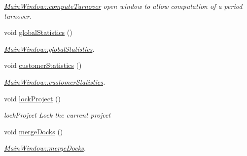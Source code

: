 \begin{DoxyCompactItemize}
\begin{DoxyCompactList}\small\item\em \hyperlink{classGui_1_1MainWindow_aa4cfc2b980835fe1ccd5b869a237c05f}{Main\-Window\-::compute\-Turnover} open window to allow computation of a period turnover. \end{DoxyCompactList}\item 
\hypertarget{classGui_1_1MainWindow_a41e44415a270150b6630efcb87768d7f}{void \hyperlink{classGui_1_1MainWindow_a41e44415a270150b6630efcb87768d7f}{global\-Statistics} ()}\label{classGui_1_1MainWindow_a41e44415a270150b6630efcb87768d7f}

\begin{DoxyCompactList}\small\item\em \hyperlink{classGui_1_1MainWindow_a41e44415a270150b6630efcb87768d7f}{Main\-Window\-::global\-Statistics}. \end{DoxyCompactList}\item 
\hypertarget{classGui_1_1MainWindow_a078b2546e65d2b91d3b2b546db619adb}{void \hyperlink{classGui_1_1MainWindow_a078b2546e65d2b91d3b2b546db619adb}{customer\-Statistics} ()}\label{classGui_1_1MainWindow_a078b2546e65d2b91d3b2b546db619adb}

\begin{DoxyCompactList}\small\item\em \hyperlink{classGui_1_1MainWindow_a078b2546e65d2b91d3b2b546db619adb}{Main\-Window\-::customer\-Statistics}. \end{DoxyCompactList}\item 
\hypertarget{classGui_1_1MainWindow_a96335036187601e48bb46945d57fc2a5}{void \hyperlink{classGui_1_1MainWindow_a96335036187601e48bb46945d57fc2a5}{lock\-Project} ()}\label{classGui_1_1MainWindow_a96335036187601e48bb46945d57fc2a5}

\begin{DoxyCompactList}\small\item\em lock\-Project Lock the current project \end{DoxyCompactList}\item 
\hypertarget{classGui_1_1MainWindow_adc45883c353219dcfbb15a3bc356909a}{void \hyperlink{classGui_1_1MainWindow_adc45883c353219dcfbb15a3bc356909a}{merge\-Docks} ()}\label{classGui_1_1MainWindow_adc45883c353219dcfbb15a3bc356909a}

\begin{DoxyCompactList}\small\item\em \hyperlink{classGui_1_1MainWindow_adc45883c353219dcfbb15a3bc356909a}{Main\-Window\-::merge\-Docks}. \end{DoxyCompactList}\end{DoxyCompactItemize}
